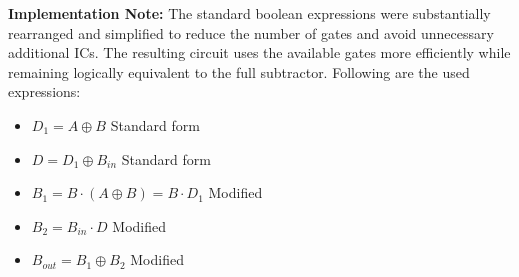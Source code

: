 \documentclass[12pt]{article}
\begin{document}
\noindent
\textbf{Implementation Note:} The standard boolean expressions were substantially rearranged and simplified to reduce the number of gates and avoid unnecessary additional ICs. The resulting circuit uses the available gates more efficiently while remaining logically equivalent to the full subtractor. Following are the used expressions:
\begin{itemize}
  \item $D_1 = A \oplus B$ \hfill Standard form
  \item $D = D_1 \oplus B_{in}$ \hfill Standard form
  \item $B_1 = B \cdot (A \oplus B) = B \cdot D_1$ \hfill Modified
  \item $B_2 = B_{in} \cdot D$ \hfill Modified
  \item $B_{out} = B_1 \oplus B_2$ \hfill Modified
\end{itemize}

\vspace{1em}
\end{document}
